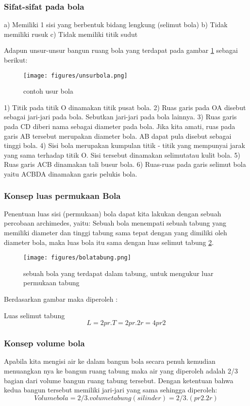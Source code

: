 \subsubsection{Sifat-sifat pada bola} 
a) Memiliki 1 sisi yang berbentuk bidang lengkung (selimut bola) 
b) Tidak memiliki rusuk 
c) Tidak memiliki titik sudut
 
Adapun unsur-unsur bangun ruang bola yang terdapat pada gambar \ref{unsurbola} sebagai berikut:
\begin{figure}[ht]
    \centerline{\texttt{[image: figures/unsurbola.png]}}
    \caption{contoh usur bola}
    \label{unsurbola}
    \end{figure}
1) Titik pada titik O dinamakan titik pusat bola.
2) Ruas garis pada OA disebut sebagai jari-jari pada bola. Sebutkan jari-jari pada bola lainnya.
3) Ruas garis pada CD diberi nama sebagai diameter pada bola. Jika kita amati, ruas pada garis AB tersebut merupakan diameter bola. AB dapat pula disebut sebagai tinggi bola.
4) Sisi bola merupakan kumpulan titik - titik yang mempunyai jarak yang sama terhadap titik O. Sisi tersebut dinamakan selimutatau kulit bola.
5) Ruas garis ACB dinamakan tali busur bola.
6) Ruas-ruas pada garis selimut bola yaitu ACBDA dinamakan garis pelukis bola.

\subsubsection{Konsep luas permukaan Bola}
Penentuan luas sisi (permukaan) bola dapat kita lakukan dengan sebuah percobaan archimedes, yaitu:
Sebuah bola menempati sebuah tabung yang memiliki diameter dan tinggi tabung sama tepat dengan 
yang dimiliki oleh diameter bola, maka luas bola itu sama dengan luas selimut tabung \ref{bolatabung}.
\begin{figure}[ht]
    \centerline{\texttt{[image: figures/bolatabung.png]}}
    \caption{sebuah bola yang terdapat dalam tabung, untuk mengukur luar permukaan tabung}
    \label{bolatabung}
    \end{figure} 
Berdasarkan gambar maka diperoleh :

Luas selimut tabung 
\begin{equation}
					L= 2 pr. T
                    = 2pr. 2r
                    = 4pr2
\end{equation}
            
\subsubsection{Konsep volume bola}
Apabila kita mengisi air ke dalam bangun bola secara penuh 
kemudian menuangkan nya ke bangun ruang tabung maka air yang diperoleh adalah 2/3 bagian dari volume bangun ruang tabung tersebut. 
Dengan ketentuan bahwa kedua bangun tersebut memiliki jari-jari yang sama sehingga diperoleh:
\begin{equation}
Volume bola = 2/3 . volume tabung(silinder)
            = 2/3 . (pr2 . 2r)
\end{equation}


